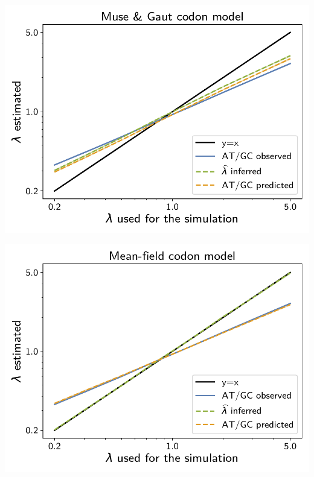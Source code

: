 \documentclass{article}
\begin{document}
\begin{center}
    \begin{minipage}{0.325\linewidth}
        \includegraphics[width=\linewidth, page=1]{inference_supp_mat/PrimatesExons10Mu8.0_lambda_MG.pdf}
    \end{minipage}
    \hfill
    \begin{minipage}{0.325\linewidth}
        \includegraphics[width=\linewidth, page=1]{inference_supp_mat/PrimatesExons10Mu8.0_lambda_MF.pdf}
    \end{minipage}
    \hfill

\end{center}
\end{document}
